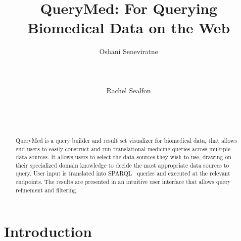 \documentclass{acm_proc_article-sp}
\begin{document}
\title{QueryMed: For Querying Biomedical Data on the Web}


\author{
\alignauthor Oshani Seneviratne\\
       \\
       \\
       \\
\alignauthor Rachel Sealfon\\
       \\
       \\
       \\
}


\maketitle
\begin{abstract}

QueryMed is a query builder and result set visualizer for biomedical data, that allows end-users to easily construct and run translational medicine queries across multiple data sources. It allows users to select the data sources they wish to use, drawing on their specialized domain knowledge to decide the most appropriate data sources to query.  User input is translated into SPARQL~\cite{SPARQL} queries and executed at the relevant endpoints. The results are presented in an intuitive user interface that allows query refinement and filtering.  

\end{abstract}


\section{Introduction}
\end{document}
